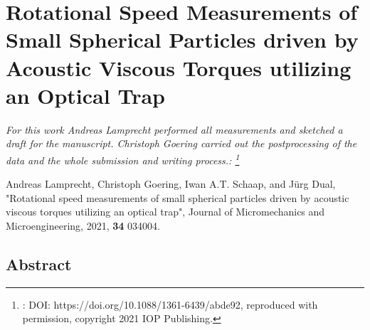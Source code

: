 \renewcommand{\relPath}{SECTION/50_Viscous_Torque}
 
\chapter[Rotation Measurement of Particles with an Optial Tweezer]{Rotational 
Speed Measurements of Small Spherical Particles driven by Acoustic Viscous 
Torques utilizing an Optical Trap}\label{ch:viscoustorque}
\textit{For this work Andreas Lamprecht performed all measurements and sketched 
  a draft for the manuscript. Christoph Goering carried out the postprocessing 
  of the data and the whole submission and writing process.:
\footnote{: DOI: https://doi.org/10.1088/1361-6439/abde92, reproduced with 
permission, copyright 2021 IOP Publishing.}}

\vspace{5mm} \noindent
Andreas Lamprecht, Christoph Goering, Iwan A.T. Schaap, and Jürg Dual,
"Rotational speed measurements of small spherical particles driven by acoustic 
viscous torques utilizing an optical trap", Journal of Micromechanics and 
Microengineering, 2021, \textbf{34} 034004.


\section{Abstract}






